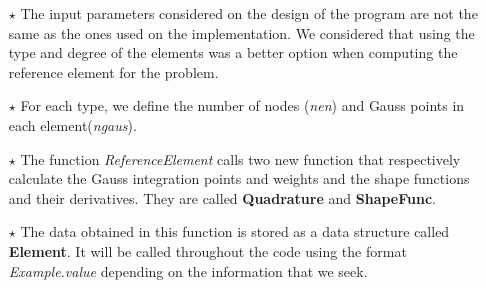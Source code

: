 \documentclass[a4paper,12pt,twoside,english]{article}
\begin{document}
\begin{enumerate}
	\item [$\star$] The input parameters considered on the design of the program are not the same as the ones used on the implementation. We considered that using the type and degree of the elements was a better option when computing the reference element for the problem.
	\item [$\star$] For each type, we define the number of nodes (\textit{nen}) and Gauss points in each element(\textit{ngaus}).
	\item [$\star$] The function \textit{ReferenceElement} calls two new function that respectively calculate the Gauss integration points and weights and the shape functions and their derivatives. They are called \textbf{Quadrature} and \textbf{ShapeFunc}.
	
  	\item [$\star$] The data obtained in this function is stored as a data structure called \textbf{Element}. It will be called throughout the code using the format \textit{Example.value} depending on the information that we seek.
  	
\end{enumerate}




	
	
\end{document}
